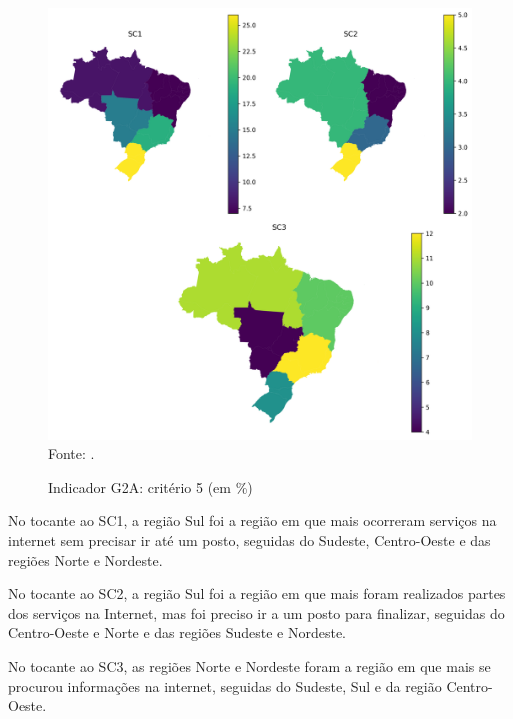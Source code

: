 \begin{figure}[H]
	\centering
	\caption{Indicador G2A: critério 5 (em \%)}
	\includegraphics[width=1\linewidth]{figuras/mapa_coropletico_tic_domicilios_2024_g2a_5.png}
	\label{fig:mapa_coropletico_tic_domicilios_2024_g2a_5}
	\footnotesize{Fonte: \cite{tic_domicilios_2024_g2a}.}
\end{figure}

No tocante ao SC1, a região Sul foi a região em que mais ocorreram serviços na internet sem precisar ir até um posto, seguidas do Sudeste, Centro-Oeste e das regiões Norte e Nordeste.

No tocante ao SC2, a região Sul foi a região em que mais foram realizados partes dos serviços na Internet, mas foi preciso ir a um posto para finalizar, seguidas do Centro-Oeste e Norte e das regiões Sudeste e Nordeste.

No tocante ao SC3, as regiões Norte e Nordeste foram a região em que mais se procurou informações na internet, seguidas do Sudeste, Sul e da região Centro-Oeste.

